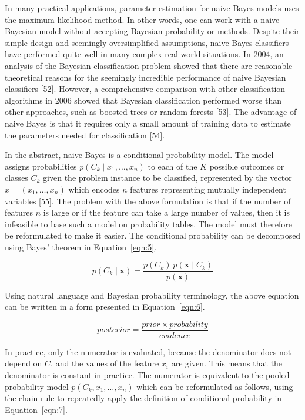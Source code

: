 \documentclass[preprint,12pt]{elsarticle}
\begin{document}
In many practical applications, parameter estimation for naive Bayes models uses the maximum likelihood method. In other words, one can work with a naive Bayesian model without accepting Bayesian probability or methods. Despite their simple design and seemingly oversimplified assumptions, naive Bayes classifiers have performed quite well in many complex real-world situations. In 2004, an analysis of the Bayesian classification problem showed that there are reasonable theoretical reasons for the seemingly incredible performance of naive Bayesian classifiers [52]. However, a comprehensive comparison with other classification algorithms in 2006 showed that Bayesian classification performed worse than other approaches, such as boosted trees or random forests [53]. The advantage of naive Bayes is that it requires only a small amount of training data to estimate the parameters needed for classification [54].

In the abstract, naive Bayes is a conditional probability model. The model assigns probabilities $p(C_{k}\mid x_{1},\ldots, x_{n})$ to each of the $K$ possible outcomes or classes $C_{k}$ given the problem instance to be classified, represented by the vector $x = (x_{1},\ldots, x_{n})$ which encodes $n$ features representing mutually independent variables [55]. The problem with the above formulation is that if the number of features $n$ is large or if the feature can take a large number of values, then it is infeasible to base such a model on probability tables. The model must therefore be reformulated to make it easier. The conditional probability can be decomposed using Bayes' theorem in Equation~\ref{eqn:5}.

\begin{equation}
	p(C_{k}\mid \mathbf{x})={\frac{p(C_{k})\ p(\mathbf{x} \mid C_{k})}{p(\mathbf{x})}}
	\label{eqn:5}
\end{equation}

Using natural language and Bayesian probability terminology, the above equation can be written in a form presented in Equation~\ref{eqn:6}.

\begin{equation}
	posterior = \frac{prior \times probability}{evidence}
	\label{eqn:6}
\end{equation}

In practice, only the numerator is evaluated, because the denominator does not depend on $C$, and the values of the feature $x_{i}$ are given. This means that the denominator is constant in practice. The numerator is equivalent to the pooled probability model $p(C_{k},x_{1},\ldots,x_{n})$ which can be reformulated as follows, using the chain rule to repeatedly apply the definition of conditional probability in Equation~\ref{eqn:7}.
\end{document}
